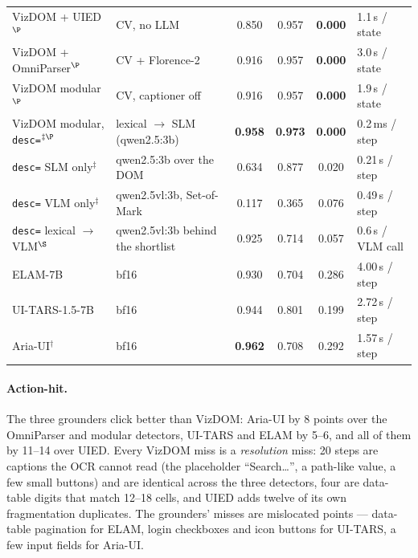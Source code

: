 \documentclass[11pt,a4paper]{article}
\newcommand{\code}[1]{\texttt{#1}}
\begin{document}
\begin{table}[H]
\begin{tabular}{@{}p{3.4cm}p{2.5cm}cccp{2.6cm}@{}}
    \midrule
    VizDOM + UIED$^\P$ & CV, no LLM & 0.850 & 0.957 & \textbf{0.000} & 1.1\,s / state \\
    VizDOM + OmniParser$^\P$ & CV + Florence-2 & 0.916 & 0.957 & \textbf{0.000} & 3.0\,s / state \\
    VizDOM modular$^\P$ & CV, captioner off & 0.916 & 0.957 & \textbf{0.000} & 1.9\,s / state \\
    VizDOM modular, \code{desc=}$^{\ddagger\P}$ & lexical $\rightarrow$ SLM (qwen2.5:3b) & \textbf{0.958} & \textbf{0.973} & \textbf{0.000} & 0.2\,ms / step \\
    \quad \code{desc=} SLM only$^\ddagger$ & qwen2.5:3b over the DOM & 0.634 & 0.877 & 0.020 & 0.21\,s / step \\
    \quad \code{desc=} VLM only$^\ddagger$ & qwen2.5vl:3b, Set-of-Mark & 0.117 & 0.365 & 0.076 & 0.49\,s / step \\
    \quad \code{desc=} lexical $\rightarrow$ VLM$^\S$ & qwen2.5vl:3b behind the shortlist & 0.925 & 0.714 & 0.057 & 0.6\,s / VLM call \\
    ELAM-7B & bf16 & 0.930 & 0.704 & 0.286 & 4.00\,s / step \\
    UI-TARS-1.5-7B & bf16 & 0.944 & 0.801 & 0.199 & 2.72\,s / step \\
    Aria-UI$^\dagger$ & bf16 & \textbf{0.962} & 0.708 & 0.292 & 1.57\,s / step \\
    \bottomrule
  \end{tabular}
\end{table}

\paragraph{Action-hit.} The three grounders click better than VizDOM: Aria-UI by
8 points over the OmniParser and modular detectors, UI-TARS and ELAM by 5--6, and all
of them by 11--14 over UIED. Every VizDOM miss is a \emph{resolution} miss: 20 steps
are captions the OCR cannot read (the placeholder ``Search\ldots'', a path-like value,
a few small buttons) and are identical across the three detectors, four are
data-table digits that match 12--18 cells, and UIED adds twelve of its own
fragmentation duplicates. The grounders' misses are mislocated points --- data-table
pagination for ELAM, login checkboxes and icon buttons for UI-TARS, a few input
fields for Aria-UI.
\end{document}
